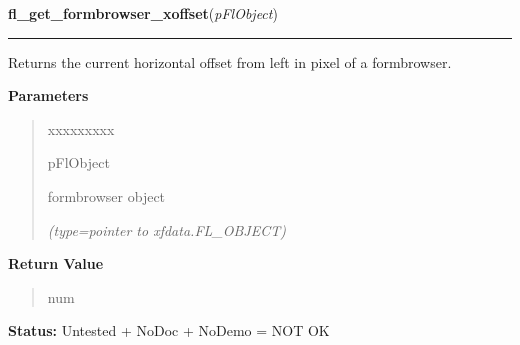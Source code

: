 \hspace{.8\funcindent}\begin{boxedminipage}{\funcwidth}

    \raggedright \textbf{fl\_get\_formbrowser\_xoffset}(\textit{pFlObject})

    \vspace{-1.5ex}

    \rule{\textwidth}{0.5\fboxrule}
\setlength{\parskip}{2ex}
    Returns the current horizontal offset from left in pixel of a 
    formbrowser.

\setlength{\parskip}{1ex}
      \textbf{Parameters}
      \vspace{-1ex}

      \begin{quote}
        \begin{Ventry}{xxxxxxxxx}

          \item[pFlObject]

          formbrowser object

            {\it (type=pointer to xfdata.FL\_OBJECT)}

        \end{Ventry}

      \end{quote}

      \textbf{Return Value}
    \vspace{-1ex}

      \begin{quote}
      num

      \end{quote}

\textbf{Status:} Untested + NoDoc + NoDemo = NOT OK



    \end{boxedminipage}

    \label{xformslib:flformbrowser:fl_get_formbrowser_yoffset}

    \vspace{0.5ex}

